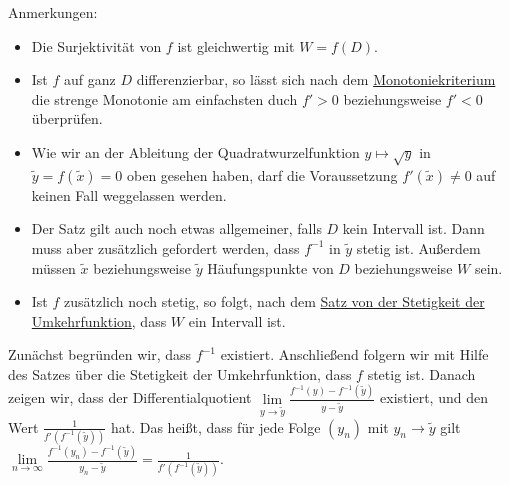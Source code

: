 \documentclass[fontsize=9pt,
               parskip=half-,
               DIV=14,
               listof=chapterentry,
               tocflat]{scrbook}
\begin{document}
\begin{explanation*}
Anmerkungen:

\begin{itemize}
\item Die Surjektivität von $f$ ist gleichwertig mit $W=f(D)$.
\item Ist $f$ auf ganz $D$ differenzierbar, so lässt sich nach dem \href{https://de.wikibooks.org/wiki/Mathe\_für\_Nicht-Freaks:\_Monotoniekriterium:\_Zusammenhang\_zwischen\_Monotonie\_und\_Ableitung\_einer\_Funktion}
{Monotoniekriterium} die strenge Monotonie am einfachsten duch $f'>0$ beziehungsweise $f'<0$ überprüfen.
\item Wie wir an der Ableitung der Quadratwurzelfunktion $y\mapsto {\sqrt {y}}$ in ${\tilde {y}}=f({\tilde {x}})=0$ oben gesehen haben, darf die Voraussetzung $f'({\tilde {x}})\neq 0$ auf keinen Fall weggelassen werden.
\item Der Satz gilt auch noch etwas allgemeiner, falls $D$ kein Intervall ist. Dann muss aber zusätzlich gefordert werden, dass $f^{-1}$ in ${\tilde {y}}$ stetig ist. Außerdem müssen ${\tilde {x}}$ beziehungsweise ${\tilde {y}}$ Häufungspunkte von $D$ beziehungsweise $W$ sein.
\item Ist $f$ zusätzlich noch stetig, so folgt, nach dem \href{https://de.wikibooks.org/wiki/Mathe\_für\_Nicht-Freaks:\_Stetigkeit\_der\_Umkehrfunktion\#Anker:Satz}
{Satz von der Stetigkeit der Umkehrfunktion}, dass $W$ ein Intervall ist.
\end{itemize}

\end{explanation*}

\begin{proofsummary*}
Zunächst begründen wir, dass $f^{-1}$ existiert. Anschließend folgern wir mit Hilfe des Satzes über die Stetigkeit der Umkehrfunktion, dass $f$ stetig ist. Danach zeigen wir, dass der Differentialquotient $\lim \limits _{y\to {\tilde {y}}}{\tfrac {f^{-1}(y)-f^{-1}({\tilde {y}})}{y-{\tilde {y}}}}$ existiert, und den Wert ${\tfrac {1}{f'(f^{-1}({\tilde {y}}))}}$ hat. Das heißt, dass für jede Folge $(y_{n})$ mit $y_{n}\to {\tilde {y}}$ gilt $\lim \limits _{n\to \infty }{\tfrac {f^{-1}(y_{n})-f^{-1}({\tilde {y}})}{y_{n}-{\tilde {y}}}}={\tfrac {1}{f'(f^{-1}({\tilde {y}}))}}$.

\end{proofsummary*}
\end{document}

